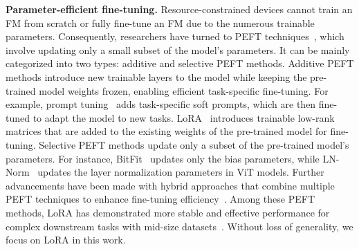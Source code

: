 \documentclass[lettersize,journal]{IEEEtran}
\begin{document}
\textbf{Parameter-efficient fine-tuning.} 
Resource-constrained devices cannot train an FM from scratch or fully fine-tune an FM due to the numerous trainable parameters.
Consequently, researchers have turned to {PEFT} techniques~\cite{ding2022delta, lester2021power, zaken2022bitfit, hu2021lora}, which involve updating only a small subset of the model's parameters. It can be mainly categorized into two types: additive and selective PEFT methods. Additive PEFT methods introduce new trainable layers to the model while keeping the pre-trained model weights frozen, enabling efficient task-specific fine-tuning. For example, prompt tuning~\cite{lester2021power} adds task-specific soft prompts, which are then fine-tuned to adapt the model to new tasks. 
LoRA~\cite{hu2021lora} introduces trainable low-rank matrices that are added to the existing weights of the pre-trained model for fine-tuning. 
% 
Selective PEFT methods update only a subset of the pre-trained model's parameters. For instance, BitFit~\cite{zaken2022bitfit} updates only the bias parameters, while LN-Norm~\cite{basu2024strong} updates the layer normalization parameters in ViT models. Further advancements have been made with hybrid approaches that combine multiple PEFT techniques to enhance fine-tuning efficiency~\cite{he2021towards, zhou2023autopeft}. Among these PEFT methods, LoRA has demonstrated more stable and effective performance for complex downstream tasks with mid-size datasets~\cite{ding2022delta, zhang2023fedpetuning}. Without loss of generality, we focus on LoRA in this work. 
\end{document}
